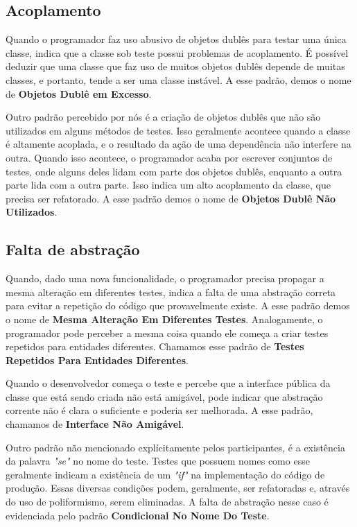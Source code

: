 \subsection{Acoplamento}

Quando o programador faz uso abusivo de objetos dublês para testar uma
única classe, indica que a classe sob teste possui problemas
de acoplamento. É possível deduzir que uma classe que faz uso de muitos
objetos dublês depende de muitas classes, e portanto, tende a ser
uma classe instável. A esse padrão, demos o nome de \textbf{Objetos Dublê em Excesso}.

Outro padrão percebido por nós é a criação de objetos dublês que não
são utilizados em alguns métodos de testes. Isso geralmente acontece quando
a classe é altamente acoplada, e o resultado da ação de uma dependência não
interfere na outra. Quando isso acontece, o programador acaba por escrever
conjuntos de testes, onde alguns deles lidam com parte dos objetos dublês,
enquanto a outra parte lida com a outra parte. Isso indica um alto acoplamento 
da classe, que precisa ser refatorado. A esse padrão demos o nome de
\textbf{Objetos Dublê Não Utilizados}.


\subsection{Falta de abstração}

Quando, dado uma nova funcionalidade, o programador precisa propagar
a mesma alteração em diferentes testes, indica a falta de uma abstração 
correta para evitar a repetição do código que provavelmente existe. A 
esse padrão demos o nome de \textbf{Mesma Alteração Em Diferentes Testes}.
Analogamente, o programador pode perceber a mesma coisa
quando ele começa a criar testes repetidos para entidades diferentes.
Chamamos esse padrão de \textbf{Testes Repetidos Para Entidades Diferentes}.

Quando o desenvolvedor começa o teste e percebe que a interface pública da classe
que está sendo criada não está amigável, pode indicar que abstração
corrente não é clara o suficiente e poderia ser melhorada. A esse padrão,
chamamos de \textbf{Interface Não Amigável}.

Outro padrão não mencionado explícitamente pelos participantes, 
é a existência da palavra \textit{"se"} no nome do teste. Testes que
possuem nomes como esse geralmente indicam a existência de um \textit{"if"} na implementação
do código de produção. Essas diversas condições podem, geralmente, ser refatoradas e,
através do uso de poliformismo, serem eliminadas. A falta de abstração nesse caso
é evidenciada pelo padrão \textbf{Condicional No Nome Do Teste}.

